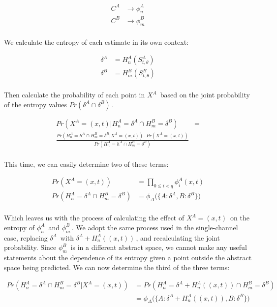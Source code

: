 \documentclass[10pt]{article}
\begin{document}
\begin{align*}
C^A &\rightarrow \phi_n^A \\
C^B &\rightarrow \phi_m^B \\
\end{align*}

We calculate the entropy of each estimate in its own context:

\begin{align*}
\delta^A &= H_n^A( S_{t,\theta}^A ) \\
\delta^B &= H_m^B( S_{t,\theta}^B ) \\
\end{align*}

Then calculate the probability of each point in \(X^A \,\!\) based on the joint probability of the entropy values \(Pr(\delta^A \cap \delta^B) \,\!\).

\[ \begin{split}
Pr( X^A = (x,t) | H_n^A = \delta^A \cap H_m^B = \delta^B ) &= \\
\frac 
{ Pr( H_n^A = h^A \cap H_m^B = \delta^B | X^A = (x,t) ) \cdot Pr( X^A = (x,t) ) }
{ Pr( H_n^A = h^A \cap H_m^B = \delta^B ) } \\
\end{split} \]

This time, we can easily determine two of these terms:

\begin{align*}
Pr( X^A = (x,t) ) &= \prod_{0 \le i < q} \phi_i^A(x,t) \\
Pr( H_n^A = \delta^A \cap H_m^B = \delta^B ) &= \phi_\Delta \Big( \{ A: \delta^A, B: \delta^B \} \Big) \\
\end{align*}

Which leaves us with the process of calculating the effect of \(X^A = (x,t) \,\!\) on the entropy of \(\phi_n^A \,\!\) and \(\phi_m^B \,\!\).  We adopt the same process used in the single-channel case, replacing \(\delta^A \,\!\) with \(\delta^A + H_n^A((x,t)) \,\!\), and recalculating the joint probability. Since \(\phi_m^B \,\!\) is in a different abstract space, we cannot make any useful statements about the dependence of its entropy given a point outside the abstract space being predicted.  We can now determine the third of the three terms:

\begin{align*}
Pr( H_n^A = \delta^A \cap H_m^B = \delta^B | X^A = (x,t) ) &= Pr( H_n^A = \delta^A + H_n^A((x,t)) \cap H_m^B = \delta^B ) \\
&= \phi_\Delta \Big( \{ A:\delta^A + H_n^A((x,t)), B: \delta^B \} \Big) \\
\end{align*}
\end{document}
